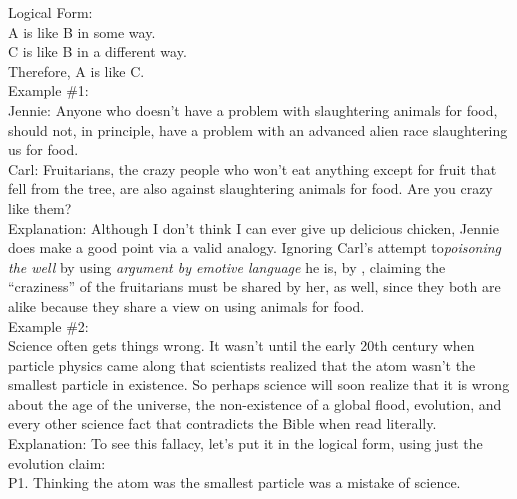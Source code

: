 \documentclass[a4paper,12pt,single,pdftex]{scrbook}
\begin{document}
    
      Logical Form:
    \\

    
      A is like B in some way.
    \\

    
      C is like B in a different way.
    \\

    
      Therefore, A is like C.
    \\

    
      Example \#1:
    \\

    
      Jennie: Anyone who doesn’t have a problem with slaughtering animals for food, should not, in principle, have a problem with an advanced alien race slaughtering us for food.
    \\

    
      Carl: Fruitarians, the crazy people who won’t eat anything except for fruit that fell from the tree, are also against slaughtering animals for food.  Are you crazy like them?
    \\

    
      Explanation: Although I don’t think I can ever give up delicious chicken, Jennie does make a good point via a valid analogy.  Ignoring Carl’s attempt to{\it  poisoning the well }by using {\it argument by emotive language} he is, by{\it  
}, claiming the “craziness” of the fruitarians must be shared by her, as well, since they both are alike because they share a view on using animals for food.
    \\

    
      Example \#2:
    \\

    
      Science often gets things wrong.  It wasn’t until the early 20th century when particle physics came along that scientists realized that the atom wasn’t the smallest particle in existence.  So perhaps science will soon realize that it is wrong about the age of the universe, the non-existence of a global flood, evolution, and every other science fact that contradicts the Bible when read literally.
    \\

    
      Explanation: To see this fallacy, let’s put it in the logical form, using just the evolution claim:
    \\

    
      P1. Thinking the atom was the smallest particle was a mistake of science.
    \\
\end{document}
